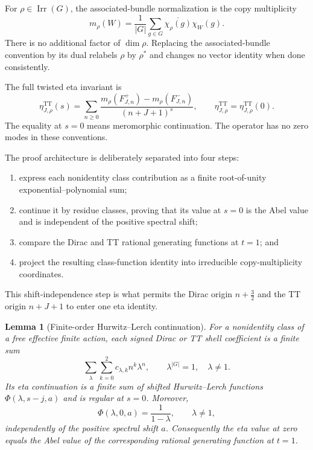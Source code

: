 \documentclass[11pt]{article}
\newtheorem{lemma}[theorem]{Lemma}
\theoremstyle{definition}
\newcommand{\TT}{\mathrm{TT}}
\newcommand{\Irr}{\operatorname{Irr}}
\begin{document}
For $\rho\in\Irr(G)$, the associated-bundle normalization is the copy
multiplicity
\begin{equation}
 m_\rho(W)=\frac1{|G|}\sum_{g\in G}
 \overline{\chi_\rho(g)}\chi_W(g).
 \label{eq:copy-multiplicity}
\end{equation}
There is no additional factor of $\dim\rho$.  Replacing the associated-bundle
convention by its dual relabels $\rho$ by $\rho^*$ and changes no vector
identity when done consistently.

The full twisted eta invariant is
\begin{equation}
 \eta^{\TT}_{J,\rho}(s)=
 \sum_{n\geq0}
 \frac{m_\rho(F^+_{J,n})-m_\rho(F^-_{J,n})}
 {(n+J+1)^s},
 \qquad
 \eta^{\TT}_{J,\rho}=\eta^{\TT}_{J,\rho}(0).
 \label{eq:tt-eta-definition}
\end{equation}
The equality at $s=0$ means meromorphic continuation.  The operator has no
zero modes in these conventions.

The proof architecture is deliberately separated into four steps:
\begin{enumerate}[label=(\roman*)]
\item express each nonidentity class contribution as a finite
root-of-unity exponential--polynomial sum;
\item continue it by residue classes, proving that its value at $s=0$ is the
Abel value and is independent of the positive spectral shift;
\item compare the Dirac and TT rational generating functions at $t=1$; and
\item project the resulting class-function identity into irreducible
copy-multiplicity coordinates.
\end{enumerate}
This shift-independence step is what permits the Dirac origin
$n+\tfrac32$ and the TT origin $n+J+1$ to enter one eta identity.

\begin{lemma}[Finite-order Hurwitz--Lerch continuation]
\label{lem:hurwitz-continuation}
For a nonidentity class of a free effective finite action, each signed Dirac
or TT shell coefficient is a finite sum
\begin{equation}
 \sum_{\lambda}\sum_{k=0}^2 c_{\lambda,k}n^k\lambda^n,
 \qquad \lambda^{|G|}=1,\quad\lambda\ne1.
 \label{eq:finite-order-shell}
\end{equation}
Its eta continuation is a finite sum of shifted Hurwitz--Lerch functions
$\Phi(\lambda,s-j,a)$ and is regular at $s=0$.
Moreover,
\begin{equation}
 \Phi(\lambda,0,a)=\frac1{1-\lambda},
 \qquad\lambda\ne1,
 \label{eq:lerch-zero}
\end{equation}
independently of the positive spectral shift $a$.  Consequently the eta value
at zero equals the Abel value of the corresponding rational generating
function at $t=1$.
\end{lemma}
\end{document}
